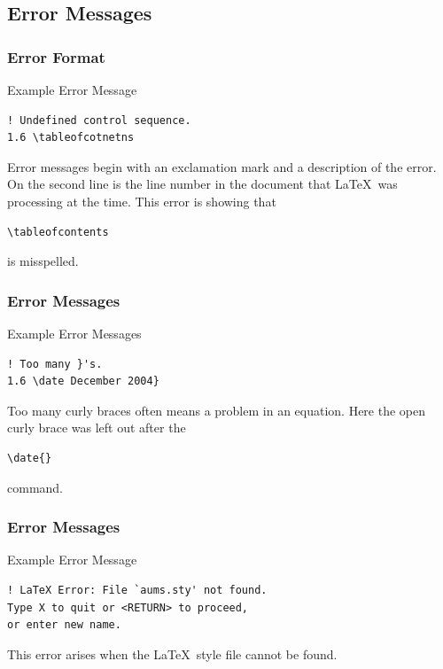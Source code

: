 \documentclass{beamer}
\begin{document}
\subsection{Error Messages}
\begin{frame}[fragile]
\frametitle{Error Format}

\begin{block}{Example Error Message}

\begin{verbatim}
! Undefined control sequence.
1.6 \tableofcotnetns
\end{verbatim}

\end{block}

Error messages begin with an exclamation mark and a description of the error.  On the second line is the line number in the document that \LaTeX \ was processing at the time.  This error is showing that \begin{verbatim}\tableofcontents \end{verbatim} is misspelled.

\end{frame}

\begin{frame}[fragile]
\frametitle{Error Messages}
\begin{block}{Example Error Messages}

\begin{verbatim}
! Too many }'s.
1.6 \date December 2004}
\end{verbatim}

\end{block}

Too many curly braces often means a problem in an equation.  Here the open curly brace was left out after the \begin{verbatim}\date{}\end{verbatim} command.

\end{frame}

\begin{frame}[fragile]
\frametitle{Error Messages}

\begin{block}{Example Error Message}
\begin{verbatim}
! LaTeX Error: File `aums.sty' not found.
Type X to quit or <RETURN> to proceed,
or enter new name.
\end{verbatim}
\end{block}

This error arises when the \LaTeX \ style file cannot be found.

\end{frame}
\end{document}
